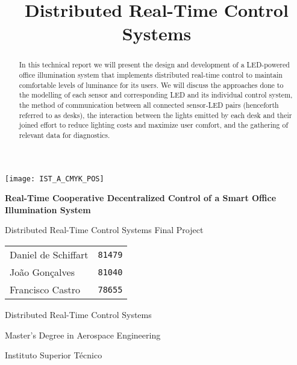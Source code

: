 \documentclass[english,fira]{ist-report}
\title{Distributed Real-Time Control Systems}
\begin{document}
\begin{titlepage}

\begin{center}
	\vspace*{0.1\textheight}
	\texttt{[image: IST\_A\_CMYK\_POS]}
	
	\vspace*{0.1\textheight}
	{\huge\bfseries Real-Time Cooperative Decentralized Control of a Smart Office Illumination System}
	
	\vspace*{0.03\textheight}
	{\Large Distributed Real-Time Control Systems Final Project}
	
	\vspace*{43.5mm}
	{\Large \begin{tabular}{l r} Daniel de Schiffart & \texttt{81479} \\ João Gonçalves & \texttt{81040} \\ Francisco Castro & \texttt{78655}\end{tabular}}
	
	\vspace{\fill}
	{\large Distributed Real-Time Control Systems}
	
	\vspace*{0.01\textheight}
	{\Large Master's Degree in Aerospace Engineering}
	
	\vspace*{0.01\textheight}
	{\large Instituto Superior Técnico}
\end{center}

\end{titlepage}
\setcounter{page}{1}

\begin{abstract}
	In this technical report we will present the design and development of a LED-powered office illumination system that implements distributed real-time control to maintain comfortable levels of luminance for its users. We will discuss the approaches done to the modelling of each sensor and corresponding LED and its individual control system, the method of communication between all connected sensor-LED pairs (henceforth referred to as desks), the interaction between the lights emitted by each desk and their joined effort to reduce lighting costs and maximize user comfort, and the gathering of relevant data for diagnostics.
\end{abstract}

{\hypersetup{linkcolor = black} \tableofcontents}
\end{document}

